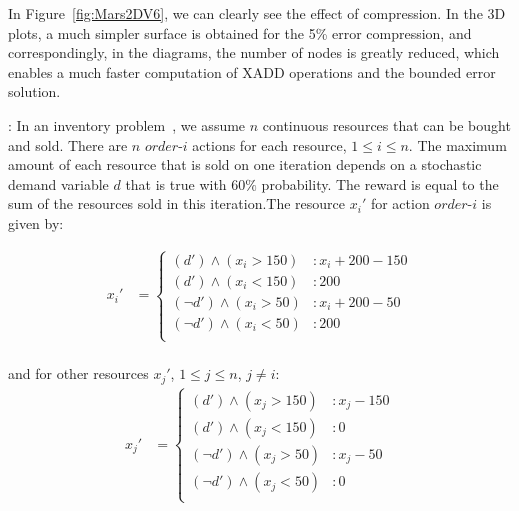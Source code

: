 In Figure~\ref{fig:Mars2DV6}, we can clearly see the effect of compression. In the 3D plots, a much simpler surface is obtained for the 5\% error compression, and correspondingly, in the diagrams, the number of nodes is greatly reduced, which enables a much faster computation of XADD operations and the bounded error solution. 

\Invent:
In an inventory problem~\cite{Scarf2002}, we assume $n$
continuous resources that can be bought and sold. There are $n$
$order$-$i$ actions for each resource, $ 1 \leq i \leq
n$. The maximum amount of each resource that is sold on one iteration
depends on a stochastic demand variable $d$ that is true with $60\%$
probability. The reward is equal to the sum of the resources sold in this iteration.The resource $x_i'$ for action $order$-$i$ is given by:

\vspace{-7mm}
{\footnotesize
\begin{align*}
x_i' & = \begin{cases} 
(d') \wedge (x_i > 150) &: x_i + 200 - 150\\
(d') \wedge (x_i < 150) &:  200\\
(\neg d') \wedge (x_i > 50) &: x_i + 200 - 50\\
(\neg d') \wedge (x_i < 50) &:  200\\
\end{cases} \\
\end{align*} }
\vspace{-13mm}

and for other resources $x_j'$, $1 \leq j \leq n$, $j\neq i$:\\

\vspace{-10mm}
{\footnotesize
\begin{align*}
x_j' & = \begin{cases} 
(d') \wedge (x_j > 150) &: x_j - 150\\
(d') \wedge (x_j < 150) &:  0\\
(\neg d') \wedge (x_j > 50) &: x_j - 50\\
(\neg d') \wedge (x_j < 50) &:  0\\
\end{cases} \\
\end{align*} }
\vspace{-12mm}

